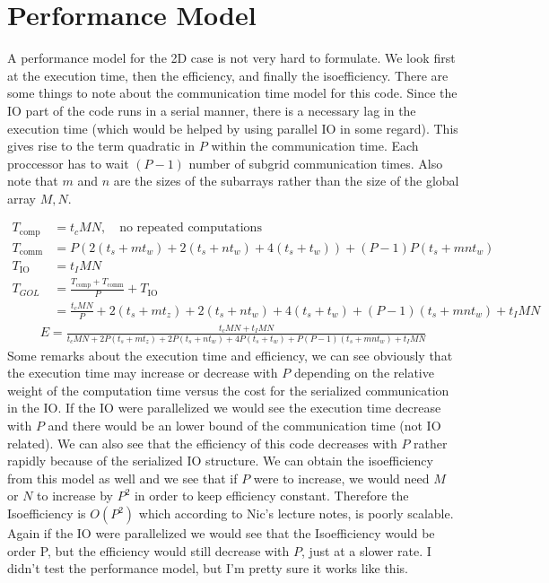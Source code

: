 \documentclass{article}
\begin{document}
\section*{Performance Model}

A performance model for the 2D case is not very hard to formulate. We look first
at the execution time, then the efficiency, and finally the isoefficiency. There
are some things to note about the communication time model for this code. Since
the IO part of the code runs in a serial manner, there is a necessary lag in the
execution time (which would be helped by using parallel IO in some regard). This
gives rise to the term quadratic in $P$ within the communication time. Each
proccessor has to wait $(P-1)$ number of subgrid communication times. Also note
that $m$ and $n$ are the sizes of the subarrays rather than the size of the global
array $M,N$. 

\begin{align*}
    T_{\text{comp}} &= t_cMN, \quad \text{no repeated computations}\\
    T_{\text{comm}} &= P(2(t_s + mt_w) + 2(t_s + nt_w) + 4(t_s + t_w)) + (P-1)P(t_s +
    mnt_w)\\
    T_{\text{IO}} &= t_IMN\\
    T_{GOL} &= \frac{T_{\text{comp}} + T_{\text{comm}}}{P} + T_{\text{IO}}\\
            &= \frac{t_cMN}{P} +
    2(t_s + mt_z) + 2(t_s + nt_w) + 4(t_s + t_w) + (P-1)(t_s+mnt_w) + t_IMN
\end{align*}
\begin{align*}
    E = \frac{t_cMN + t_IMN}{t_cMN +
    2P(t_s + mt_z) + 2P(t_s + nt_w) + 4P(t_s + t_w) + P(P-1)(t_s+mnt_w) + t_IMN}
\end{align*}
    Some remarks about the execution time and efficiency, we can see obviously
    that the execution time may increase or decrease with $P$ depending on the
    relative weight of the computation time versus the cost for the serialized
    communication in the IO. If the IO were parallelized we would see the
    execution time decrease with $P$ and there would be an lower bound of the
    communication time (not IO related). We can also see that the efficiency of
    this code decreases with $P$ rather rapidly because of the serialized
    IO structure. We can obtain the isoefficiency from this model as well and we
    see that if $P$ were to increase, we would need $M$ or $N$ to increase by
    $P^2$ in order to keep efficiency constant. Therefore the Isoefficiency is
    $O(P^2)$ which according to Nic's lecture notes, is poorly scalable. Again
    if the IO were parallelized we would see that the Isoefficiency would be
    order P, but the efficiency would still decrease with $P$, just at a slower
    rate. I didn't test the performance model, but I'm pretty sure it works like
    this. 
\end{document}
